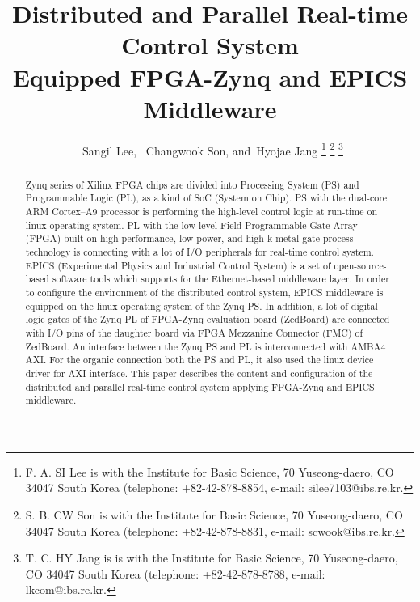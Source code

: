 \documentclass[journal]{IEEEtran}
\begin{document}
\title{Distributed and Parallel Real-time Control System \\ 
	Equipped FPGA-Zynq and EPICS Middleware}
%
%

\author{~Sangil Lee,
	~Changwook Son,
	and~Hyojae Jang%
\thanks{F. A. SI Lee is with the Institute for Basic Science, 70 Yuseong-daero, CO 34047 South Korea (telephone: +82-42-878-8854, e-mail: silee7103@ibs.re.kr.}%
\thanks{S. B. CW Son is with the Institute for Basic Science, 70 Yuseong-daero, CO 34047 South Korea (telephone: +82-42-878-8831, e-mail: scwook@ibs.re.kr.}%
\thanks{T. C. HY Jang is is with the Institute for Basic Science, 70 Yuseong-daero, CO 34047 South Korea (telephone: +82-42-878-8788, e-mail: lkcom@ibs.re.kr.}%
}

\maketitle
\thispagestyle{empty}

\begin{abstract}
Zynq series of Xilinx FPGA chips are divided into Processing System (PS) and Programmable Logic (PL), as a kind of SoC (System on Chip). PS with the dual-core ARM Cortex–A9 processor is performing the high-level control logic at run-time on linux operating system. PL with the low-level Field Programmable Gate Array (FPGA) built on high-performance, low-power, and high-k metal gate process technology is connecting with a lot of I/O peripherals for real-time control system. EPICS (Experimental Physics and Industrial Control System) is a set of open-source-based software tools which supports for the Ethernet-based middleware layer. In order to configure the environment of the distributed control system, EPICS middleware is equipped on the linux operating system of the Zynq PS. In addition, a lot of digital logic gates of the Zynq PL of FPGA-Zynq evaluation board (ZedBoard) are connected with I/O pins of the daughter board via FPGA Mezzanine Connector (FMC) of ZedBoard. An interface between the Zynq PS and PL is interconnected with AMBA4 AXI. For the organic connection both the PS and PL, it also used the linux device driver for AXI interface.
This paper describes the content and configuration of the distributed and parallel real-time control system applying FPGA-Zynq and EPICS middleware.
\end{abstract}
\end{document}
